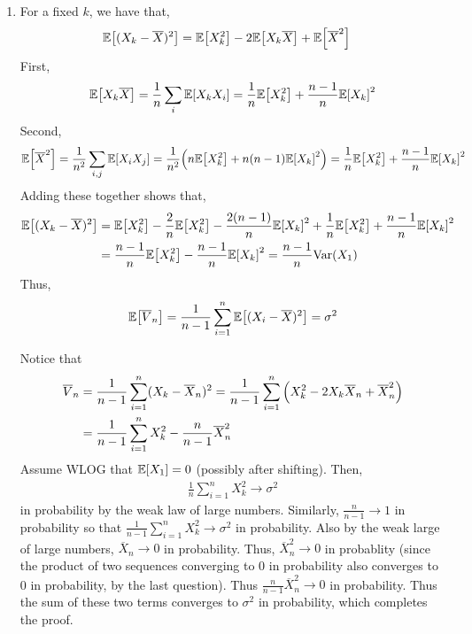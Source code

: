 \documentclass[12pt]{article}
\theoremstyle{definitionstyle}
\newcommand{\1}{\mathds 1}
\newcommand{\E}{\mathbb E \qty}
\newcommand{\Var}{\mathrm{Var}}
\begin{document}
\begin{enumerate}
        \item For a fixed $k$, we have that,
        \begin{align*}
            \E[(X_k-\overline X)^2] &= \E[X_k^2] - 2\E[X_k \overline X] + \E[\overline X^2]
        \end{align*}
        First,
        \begin{align*}
            \E[X_k \overline X] = \frac 1n \sum_i \E[X_kX_i] = \frac 1n\E[X_k^2] + \frac{n-1}n\E[X_k]^2
        \end{align*}
        Second,
        \begin{align*}
            \E[\overline X^2] = \frac{1}{n^2}\sum_{i,j} \E[X_iX_j] = \frac{1}{n^2} \qty(n\E[X_k^2] + n(n-1)\E[X_k]^2) = \frac{1}{n}\E[X_k^2] + \frac{n-1}{n}\E[X_k]^2
        \end{align*}
        Adding these together shows that,
        \begin{align*}
            \E[(X_k-\overline X)^2] &= \E[X_k^2] - \frac 2n \E[X_k^2] - \frac{2(n-1)}n \E[X_k]^2 + \frac 1n\E[X_k^2] + \frac{n-1}{n}\E[X_k]^2 
            \\&= \frac{n-1}n \E[X_k^2] - \frac{n-1}{n} \E[X_k]^2 = \frac{n-1}{n}\Var(X_1)
        \end{align*}
        Thus,
        \begin{align*}
            \E[\overline V_n] = \frac{1}{n-1} \sum_{i=1}^n \E[(X_i-\overline X)^2] = \sigma^2
        \end{align*}

        Notice that
        \begin{align*}
            \overline V_n &= \frac{1}{n-1} \sum_{i=1}^n (X_k-\overline X_n)^2 = \frac{1}{n-1} \sum_{i=1}^n \qty(X_k^2 - 2X_k\overline X_n + \overline X_n^2) \\
            &= \frac{1}{n-1} \sum_{i=1}^n X_k^2 - \frac{n}{n-1}\overline X_n^2 
        \end{align*}
        Assume WLOG that $\E[X_1]=0$ (possibly after shifting). Then,
        \begin{align*}
            \frac{1}{n} \sum_{i=1}^n X_k^2 \to \sigma^2
        \end{align*}
        in probability by the weak law of large numbers. Similarly, $\frac{n}{n-1} \to 1$ in probability so that $\frac{1}{n-1} \sum_{i=1}^n X_k^2 \to \sigma^2$ in probability. Also by the weak large of large numbers, $\overline X_n \to 0$ in probability. Thus, $\overline X_n^2 \to 0$ in probablity (since the product of two sequences converging to 0 in probability also converges to 0 in probability, by the last question). Thus $\frac{n}{n-1} \overline X_n^2 \to 0$ in probability. Thus the sum of these two terms converges to $\sigma^2$ in probability, which completes the proof.


\end{enumerate}
\end{document}
